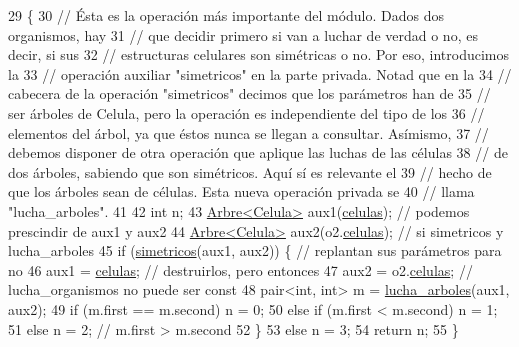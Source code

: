 \begin{DoxyCode}
29 \{
30   \textcolor{comment}{// Ésta es la operación más importante del módulo. Dados dos organismos, hay}
31   \textcolor{comment}{// que decidir primero si van a luchar de verdad o no, es decir, si sus}
32   \textcolor{comment}{// estructuras celulares son simétricas o no. Por eso, introducimos la}
33   \textcolor{comment}{// operación auxiliar "simetricos" en la parte privada.  Notad que en la}
34   \textcolor{comment}{// cabecera de la operación "simetricos" decimos que los parámetros han de}
35   \textcolor{comment}{// ser árboles de Celula, pero la operación es independiente del tipo de los}
36   \textcolor{comment}{// elementos del árbol, ya que éstos nunca se llegan a consultar.  Asímismo,}
37   \textcolor{comment}{// debemos disponer de otra operación que aplique las luchas de las células}
38   \textcolor{comment}{// de dos árboles, sabiendo que son simétricos. Aquí sí es relevante el}
39   \textcolor{comment}{// hecho de que los árboles sean de células. Esta nueva operación privada se}
40   \textcolor{comment}{// llama "lucha\_arboles".}
41 
42   \textcolor{keywordtype}{int} n;
43   \hyperlink{class_arbre}{Arbre<Celula>} aux1(\hyperlink{class_organismo_abfafb8e55144e295b406ce90951f0c68}{celulas});       \textcolor{comment}{// podemos prescindir de aux1 y aux2}
44   \hyperlink{class_arbre}{Arbre<Celula>} aux2(o2.\hyperlink{class_organismo_abfafb8e55144e295b406ce90951f0c68}{celulas});    \textcolor{comment}{// si simetricos y lucha\_arboles}
45   \textcolor{keywordflow}{if} (\hyperlink{class_organismo_ac483b268b68eed06f612ed690c22af8f}{simetricos}(aux1, aux2)) \{      \textcolor{comment}{// replantan sus parámetros para no}
46     aux1 = \hyperlink{class_organismo_abfafb8e55144e295b406ce90951f0c68}{celulas};                  \textcolor{comment}{// destruirlos, pero entonces }
47     aux2 = o2.\hyperlink{class_organismo_abfafb8e55144e295b406ce90951f0c68}{celulas};               \textcolor{comment}{// lucha\_organismos no puede ser const}
48     pair<int, int> m = \hyperlink{class_organismo_aaf643a47840f855ed3e105970f75a078}{lucha\_arboles}(aux1, aux2);
49     \textcolor{keywordflow}{if} (m.first == m.second) n = 0;
50     \textcolor{keywordflow}{else} \textcolor{keywordflow}{if} (m.first < m.second) n = 1;
51     \textcolor{keywordflow}{else} n = 2; \textcolor{comment}{// m.first > m.second}
52   \}
53   \textcolor{keywordflow}{else} n = 3;
54   \textcolor{keywordflow}{return} n;
55 \}
\end{DoxyCode}

